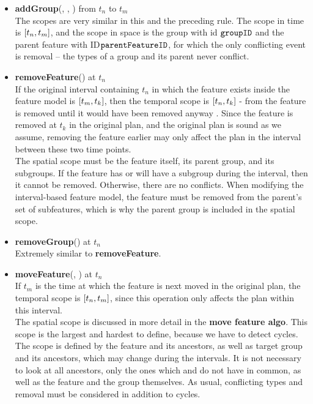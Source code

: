 \begin{itemize}
  \item \textbf{addGroup}(, , ) from $t_n$ to $t_m$\\
    The scopes are very similar in this and the preceding rule. The scope in time is $\interval{t_n}{t_m}$, and the scope in space is the group with id $\texttt{groupID}$ and the parent feature with ID$\texttt{parentFeatureID}$, for which the only conflicting event is removal -- the types of a group and its parent never conflict.
  \item \textbf{removeFeature}() at $t_n$\\
    If the original interval containing $t_n$ in which the feature exists inside the feature model is $\interval{t_m}{t_k}$, then the temporal scope is $\interval{t_n}{t_k}$ - from the feature is removed until it would have been removed anyway . Since the feature is removed at $t_k$ in the original plan, and the original plan is sound as we assume, removing the feature earlier may only affect the plan in the interval between these two time points.\\
    The spatial scope must be the feature itself, its parent group, and its subgroups. If the feature has or will have a subgroup during the interval, then it cannot be removed. Otherwise, there are no conflicts. When modifying the interval-based feature model, the feature must be removed from the parent's set of subfeatures, which is why the parent group is included in the spatial scope.
  \item \textbf{removeGroup}() at $t_n$\\
    Extremely similar to \textbf{removeFeature}. 
  \item \textbf{moveFeature}(, ) at $t_n$\\
  If $t_m$ is the time at which the feature is next moved in the original plan, the temporal scope is $\interval{t_n}{t_m}$, since this operation only affects the plan within this interval.\\
  The spatial scope is discussed in more detail in the \textbf{move feature algo}. This scope is the largest and hardest to define, because we have to detect cycles. The scope is defined by the feature and its ancestors, as well as target group and its ancestors, which may change during the intervals. It is not necessary to look at all ancestors, only the ones which  and  do not have in common, as well as the feature and the group themselves. As usual, conflicting types and removal must be considered in addition to cycles.

\end{itemize}
